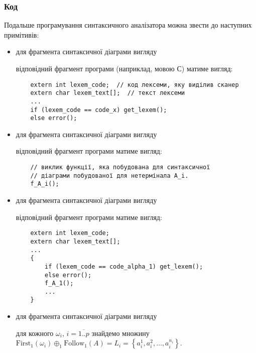 \subsubsection{Код}

Подальше програмування синтаксичного аналізатора можна звести до наступних примітивів:
\begin{itemize}
	\item для фрагмента синтаксичної діаграми вигляду 
	\begin{figure}[H]
		\centering
		
	\end{figure}
	відповідний фрагмент програми (наприклад, мовою С) матиме вигляд:
	\begin{verbatim}
	extern int lexem_code;  // код лексеми, яку виділив сканер
	extern char lexem_text[];  // текст лексеми
	...
	if (lexem_code == code_x) get_lexem();
	else error();
	\end{verbatim}

	\item для фрагмента синтаксичної діаграми вигляду
	\begin{figure}[H]
		\centering
		
	\end{figure}
	відповідний фрагмент програми матиме вигляд:
	\begin{verbatim}
	// виклик функції, яка побудована для синтаксичної 
	// діаграми побудованої для нетермінала A_i.
	f_A_i();
	\end{verbatim}
	\item для фрагмента синтаксичної діаграми вигляду
	\begin{figure}[H]
		\centering
		
	\end{figure}
	відповідний фрагмент програми матиме вигляд:
	\begin{verbatim}
	extern int lexem_code;
	extern char lexem_text[];
	...
	{
	    if (lexem_code == code_alpha_1) get_lexem();
	    else error();
	    f_A_1();
	    ...
	}
	\end{verbatim}
	\item для фрагмента синтаксичної діаграми вигляду
	\begin{figure}[H]
		\centering
		
	\end{figure}
	для кожного $\omega_i$, $i = \overline{1..p}$ знайдемо множину $\text{First}_1(\omega_i) \oplus_1 \text{Follow}_1(A) = L_i = \left\{a_i^1, a_i^2, \ldots, a_i^{n_i}\right\}$. \medskip


\end{itemize}
